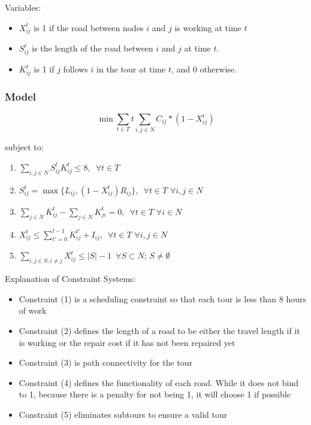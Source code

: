 \documentclass{article}
\begin{document}
Variables:
	\begin{itemize}
		\item $X_{ij}^t$ is 1 if the road between nodes $i$ and $j$ is working at time $t$
		\item $S_{ij}^t$ is the length of the road between $i$ and $j$ at time $t$. 
		\item $K_{ij}^t$ is 1 if $j$ follows $i$ in the tour at time $t$, and 0 otherwise.	
	\end{itemize}
	
	\subsubsection{Model}
	$$	\min \sum_{t \in T} t \sum_{i,j \in N} C_{ij}*(1-X_{ij}^t) $$
	
	subject to:
	\begin{enumerate}[label=(\arabic*), leftmargin=*, itemsep=0.4ex, before={\everymath{\displaystyle}}]%
		\item $\sum_{i,j \in N} S_{ij}^t K_{ij}^t \leq 8, \hspace{6pt} \forall t\in T$
		\item $S_{ij}^t = \max \{L_{ij}, (1-X_{ij}^t)R_{ij} \}, \hspace{6pt} \forall t\in T \hspace{4pt} \forall i,j \in N$
		\item $\sum_{j \in N} K_{ij}^t - \sum_{j \in N} K_{ji}^t = 0, \hspace{6pt} \forall t\in T \hspace{4pt} \forall i \in N$
		\item $X_{ij}^t \le \sum_{t'=0}^{t-1} K_{ij}^{t'} + I_{ij}, \hspace{6pt} \forall t\in T \hspace{4pt} \forall i,j \in N$
		\item $\sum_{i,j \in S; i\neq j} X_{ij}^t \leq |S|-1 \hspace{6pt} \forall S \subset N; \hspace{2pt} S \neq \emptyset$
	\end{enumerate}
	
Explanation of Constraint Systems:
	\begin{itemize}
		\item Constraint (1) is a scheduling constraint so that each tour is less than 8 hours of work
		\item Constraint (2) defines the length of a road to be either the travel length if it is working or the repair cost if it has not been repaired yet
		\item Constraint (3) is path connectivity for the tour
		\item Constraint (4) defines the functionality of each road. While it does not bind to 1, because there is a penalty for not being 1, it will choose 1 if possible
		\item Constraint (5) eliminates subtours to ensure a valid tour
	\end{itemize}
\end{document}
